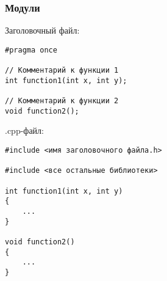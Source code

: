 \documentclass[xetex,mathserif,serif]{beamer}
\begin{document}
	\begin{frame}[fragile]
		\frametitle{Модули}
		\begin{scriptsize}
			Заголовочный файл:
			\begin{verbatim}
#pragma once

// Комментарий к функции 1
int function1(int x, int y);

// Комментарий к функции 2
void function2();
			\end{verbatim}
			.cpp-файл:
			\begin{verbatim}
#include <имя заголовочного файла.h>

#include <все остальные библиотеки>

int function1(int x, int y)
{
    ...
}

void function2()
{
    ...
}
			\end{verbatim}
		\end{scriptsize}
	\end{frame}
\end{document}

